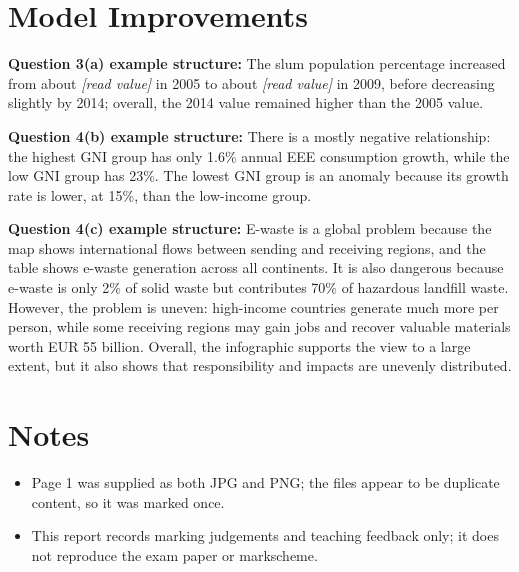 \documentclass[11pt]{article}
\begin{document}
\section*{Model Improvements}

\textbf{Question 3(a) example structure:}
The slum population percentage increased from about \emph{[read value]} in 2005 to about \emph{[read value]} in 2009, before decreasing slightly by 2014; overall, the 2014 value remained higher than the 2005 value.

\textbf{Question 4(b) example structure:}
There is a mostly negative relationship: the highest GNI group has only 1.6\% annual EEE consumption growth, while the low GNI group has 23\%. The lowest GNI group is an anomaly because its growth rate is lower, at 15\%, than the low-income group.

\textbf{Question 4(c) example structure:}
E-waste is a global problem because the map shows international flows between sending and receiving regions, and the table shows e-waste generation across all continents. It is also dangerous because e-waste is only 2\% of solid waste but contributes 70\% of hazardous landfill waste. However, the problem is uneven: high-income countries generate much more per person, while some receiving regions may gain jobs and recover valuable materials worth EUR 55 billion. Overall, the infographic supports the view to a large extent, but it also shows that responsibility and impacts are unevenly distributed.

\section*{Notes}

\begin{itemize}
  \item Page 1 was supplied as both JPG and PNG; the files appear to be duplicate content, so it was marked once.
  \item This report records marking judgements and teaching feedback only; it does not reproduce the exam paper or markscheme.
\end{itemize}
\end{document}
